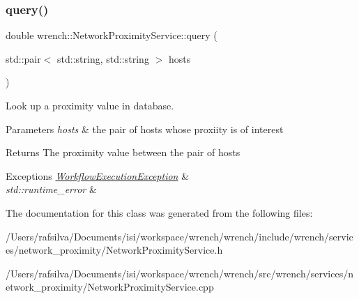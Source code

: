\subsubsection{\texorpdfstring{query()}{query()}}
{\footnotesize\ttfamily double wrench\+::\+Network\+Proximity\+Service\+::query (\begin{DoxyParamCaption}\item[{std\+::pair$<$ std\+::string, std\+::string $>$}]{hosts }\end{DoxyParamCaption})}



Look up a proximity value in database. 


\begin{DoxyParams}{Parameters}
{\em hosts} & the pair of hosts whose proxiity is of interest \\
\hline
\end{DoxyParams}
\begin{DoxyReturn}{Returns}
The proximity value between the pair of hosts
\end{DoxyReturn}

\begin{DoxyExceptions}{Exceptions}
{\em \hyperlink{classwrench_1_1_workflow_execution_exception}{Workflow\+Execution\+Exception}} & \\
\hline
{\em std\+::runtime\+\_\+error} & \\
\hline
\end{DoxyExceptions}


The documentation for this class was generated from the following files\+:\begin{DoxyCompactItemize}
\item 
/\+Users/rafsilva/\+Documents/isi/workspace/wrench/wrench/include/wrench/services/network\+\_\+proximity/Network\+Proximity\+Service.\+h\item 
/\+Users/rafsilva/\+Documents/isi/workspace/wrench/wrench/src/wrench/services/network\+\_\+proximity/Network\+Proximity\+Service.\+cpp\end{DoxyCompactItemize}
